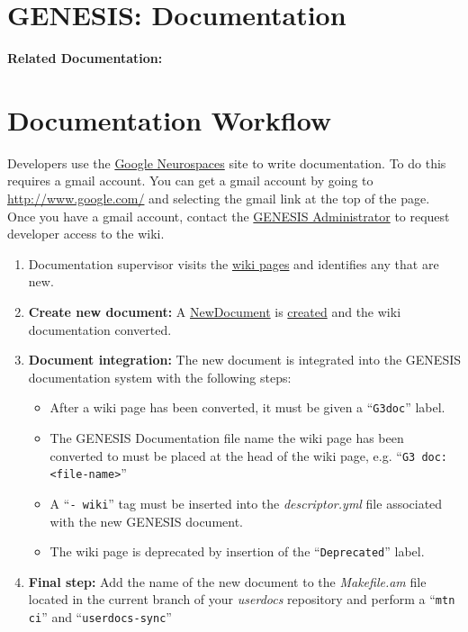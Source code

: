 \documentclass[12pt]{article}
\begin{document}
\section*{GENESIS: Documentation}

{\bf Related Documentation:}

\section*{Documentation Workflow}

Developers use the \href{http://code.google.com/p/neurospaces/wiki/Index}{Google Neurospaces} site to write documentation. To do this requires a gmail account. You can get a gmail account by going to \href{http://www.google.com/}{http://www.google.com/} and selecting the gmail link at the top of the page. Once you have a gmail account, contact the \href{http://www.genesis-sim.org/contact}{GENESIS Administrator} to request developer access to the wiki.
\begin{enumerate}
\item Documentation supervisor visits the \href{http://code.google.com/p/neurospaces/w/list}{wiki pages} and identifies any that are new.
\item{\bf Create new document:} A \href{../NewDocument/NewDocument.tex}{NewDocument} is \href{../document-create/document-create.tex}{created} and the wiki documentation converted.
\item{\bf Document integration:} The new document is integrated into the GENESIS documentation system with the following steps:
\begin{itemize}
\item  After a wiki page has been converted, it must be given a ``{\tt G3doc}'' label.
\item The GENESIS Documentation file name the wiki page has been converted to must be placed at the head of the wiki page, e.g. ``{\tt G3 doc: <file-name>}''
\item A ``{\tt -\,wiki}'' tag must be inserted into the {\it descriptor.yml} file associated with the new GENESIS document.
\item The wiki page is deprecated by insertion of the ``{\tt Deprecated}'' label.
\end{itemize}
\item {\bf Final step:} Add the name of the new document to the {\it Makefile.am} file located in the current branch of your {\it userdocs} repository and perform a ``{\tt mtn ci}'' and ``{\tt userdocs-sync}''
\end{enumerate}
\end{document}
